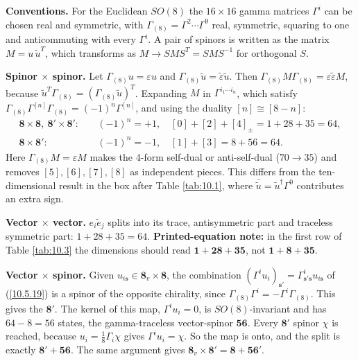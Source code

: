 	\begin{tcolorbox}[breakable]
		\begin{remark}
			\textbf{Conventions.} For the Euclidean $SO(8)$ the $16\times16$ gamma matrices $\Gamma^i$ can be chosen real and symmetric, with $\Gamma_{(8)}=\Gamma^2\cdots\Gamma^9$ real, symmetric, squaring to one and anticommuting with every $\Gamma^i$. A pair of spinors is written as the matrix $M=u\,\tilde u^{T}$, which transforms as $M\to SMS^{T}=SMS^{-1}$ for orthogonal $S$.

			\textbf{Spinor $\times$ spinor.} Let $\Gamma_{(8)}u=\varepsilon u$ and $\Gamma_{(8)}\tilde u=\tilde\varepsilon\tilde u$. Then $\Gamma_{(8)}M\Gamma_{(8)}=\varepsilon\tilde\varepsilon M$, because $\tilde u^{T}\Gamma_{(8)}=(\Gamma_{(8)}\tilde u)^{T}$. Expanding $M$ in $\Gamma^{i_1\cdots i_n}$, which satisfy $\Gamma_{(8)}\Gamma^{[n]}\Gamma_{(8)}=(-1)^n\Gamma^{[n]}$, and using the duality $[n]\cong[8-n]$:
			\begin{align*}
				\mathbf8\times\mathbf8,\ \mathbf8'\times\mathbf8':&\quad (-1)^n=+1,\quad [0]+[2]+[4]_{\pm}=1+28+35=64,\\
				\mathbf8\times\mathbf8':&\quad (-1)^n=-1,\quad [1]+[3]=8+56=64 .
			\end{align*}
			Here $\Gamma_{(8)}M=\varepsilon M$ makes the 4-form self-dual or anti-self-dual ($70\to35$) and removes $[5],[6],[7],[8]$ as independent pieces. This differs from the ten-dimensional result in the box after Table \ref{tab:10.1}, where $\bar{\tilde u}=\tilde u^\dagger\Gamma^0$ contributes an extra sign.

			\textbf{Vector $\times$ vector.} $e_i\tilde e_j$ splits into its trace, antisymmetric part and traceless symmetric part: $1+28+35=64$. \textbf{Printed-equation note:} in the first row of Table \ref{tab:10.3} the dimensions should read $\mathbf1+\mathbf{28}+\mathbf{35}$, not $\mathbf1+\mathbf8+\mathbf{35}$.

			\textbf{Vector $\times$ spinor.} Given $u_{i\mathbf s}\in\mathbf8_v\times\mathbf8$, the combination $(\Gamma^iu_i)_{\mathbf s'}=\Gamma^i_{\mathbf s'\mathbf s}u_{i\mathbf s}$ of (\ref{10.5.19}) is a spinor of the opposite chirality, since $\Gamma_{(8)}\Gamma^i=-\Gamma^i\Gamma_{(8)}$. This gives the $\mathbf8'$. The kernel of this map, $\Gamma^iu_i=0$, is $SO(8)$-invariant and has $64-8=56$ states, the gamma-traceless vector-spinor $\mathbf{56}$. Every $\mathbf8'$ spinor $\chi$ is reached, because $u_i=\tfrac18\Gamma_i\chi$ gives $\Gamma^iu_i=\chi$. So the map is onto, and the split is exactly $\mathbf8'+\mathbf{56}$. The same argument gives $\mathbf8_v\times\mathbf8'=\mathbf8+\mathbf{56}'$.
		\end{remark}
	\end{tcolorbox}
	
